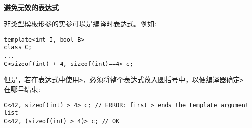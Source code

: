 \hspace*{\fill} \\ %
\noindent
\textbf{避免无效的表达式}

非类型模板形参的实参可以是编译时表达式。例如:

\begin{lstlisting}[style=styleCXX]
template<int I, bool B>
class C;
...
C<sizeof(int) + 4, sizeof(int)==4> c;
\end{lstlisting}

但是，若在表达式中使用\texttt{>}，必须将整个表达式放入圆括号中，以便编译器确定\texttt{>}在哪里结束:

\begin{lstlisting}[style=styleCXX]
C<42, sizeof(int) > 4> c; // ERROR: first > ends the template argument list
C<42, (sizeof(int) > 4)> c; // OK
\end{lstlisting}











